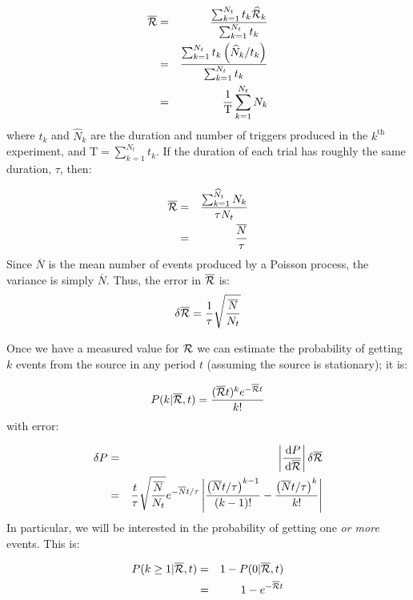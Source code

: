 \begin{eqnarray}
\label{eqn:avg_rate_param}
\overline{\mathcal{R}} & = & \frac{\sum_{k=1}^{N_t} t_k \widehat{\mathcal{R}}_k}{\sum_{k=1}^{N_t} t_k} \nonumber \\
 & = & \frac{\sum_{k=1}^{N_t} t_k \left(\widehat{N}_k/t_k\right)}{\sum_{k=1}^{N_t} t_k} \nonumber \\
 & = & \frac{1}{\mathrm{T}}\sum_{k=1}^{N_t} N_k
 \end{eqnarray}
where $t_k$ and $\widehat{N}_k$ are the duration and number of triggers produced in the $k^{\mathrm{th}}$ experiment, and $\mathrm{T} = \sum_{k=1}^{N_t} t_k$. If the duration of each trial has roughly the same duration, $\tau$, then:

\begin{eqnarray}
\overline{\mathcal{R}} & = & \frac{\sum_{k=1}^{\widehat{N}_t} N_k}{\tau N_t} \\
 & = & \frac{\overline{N}}{\tau}
 \end{eqnarray}
Since $\overline{N}$ is the mean number of events produced by a Poisson process, the variance is simply $\overline{N}$. Thus, the error in $\overline{\mathcal{R}}$ is:
\begin{equation}
\label{eqn:err_R}
\delta \overline{\mathcal{R}} = \frac{1}{\tau}\sqrt{\frac{\overline{N}}{N_t}}
\end{equation}

Once we have a measured value for $\mathcal{R}$ we can estimate the probability of getting $k$ events from the source in any period $t$ (assuming the source is stationary); it is:

\begin{equation}
\label{eqn:prob_Rt}
P(k|\overline{\mathcal{R}},t) = \frac{(\overline{\mathcal{R}} t)^k e^{-\overline{\mathcal{R}} t}}{k!}
\end{equation}
with error:

\begin{eqnarray}
\label{eqn:err_rate_param}
\delta P & = & \left| \frac{\,\mathrm{d}{P}}{\,\mathrm{d}{\overline{\mathcal{R}}}} \right| \delta \overline{\mathcal{R}} \nonumber \\
         & = & \frac{t}{\tau}\sqrt{\frac{\overline{N}}{N_t}} e^{-\overline{N}t/\tau} \left| \frac{\left(\overline{N}t/\tau \right)^{k-1}}{\left( k-1 \right)!} - \frac{\left(\overline{N}t/\tau \right)^{k}}{k!} \right|
\end{eqnarray}
In particular, we will be interested in the probability of getting one \emph{or more} events. This is:

\begin{eqnarray}
\label{eqn:one_or_more}
P(k\geq1 | \overline{\mathcal{R}},t) & = & 1 - P(0 | \overline{\mathcal{R}},t) \nonumber \\
 & = & 1 - e^{-\overline{\mathcal{R}}t}
 \end{eqnarray}

